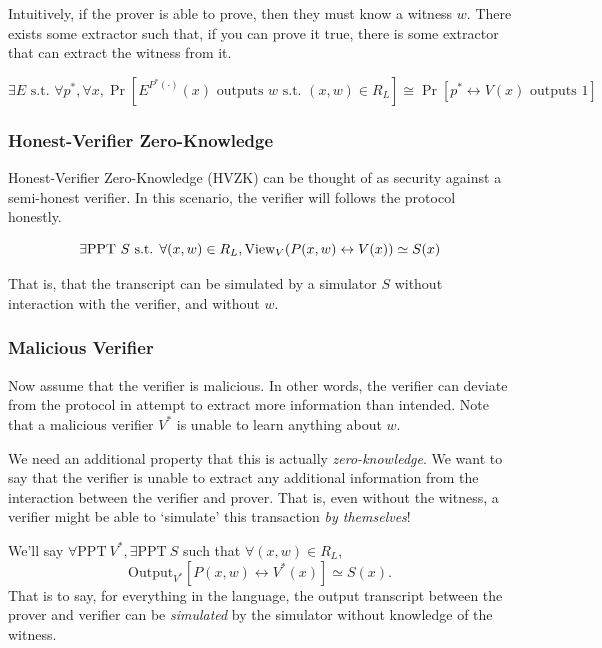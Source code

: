 Intuitively, if the prover is able to prove, then they must know a witness $w$. There exists some extractor such that, if you can prove it true, there is some extractor that can extract the witness from it.

\[ \exists E \text{ s.t. } \forall p^*, \forall x, \Pr[E^{P^*(\cdot)}(x) \text{ outputs }w \text{ s.t. }(x, w) \in R_L] \cong \Pr[p^* \leftrightarrow V(x) \text{ outputs } 1]\]

\subsubsection{Honest-Verifier Zero-Knowledge}

Honest-Verifier Zero-Knowledge (HVZK) can be thought of as security against a semi-honest verifier. In this scenario, the verifier will follows the protocol honestly.

\[\exists\mathrm{PPT}\ S\text{ s.t. }\forall(x, w)\in R_L, \mathrm{View}_V(P(x, w)\leftrightarrow V(x))\simeq S(x)\]

That is, that the transcript can be simulated by a simulator $S$ without interaction with the verifier, and without $w$.

\subsubsection{Malicious Verifier}

Now assume that the verifier is malicious. In other words, the verifier can deviate from the protocol in attempt to extract more information than intended. Note that a malicious verifier $V^*$ is unable to learn anything about $w$.

We need an additional property that this is actually \emph{zero-knowledge}. We want to say that the verifier is unable to extract any additional information from the interaction between the verifier and prover. That is, even without the witness, a verifier might be able to `simulate' this transaction \emph{by themselves}!

    We'll say $\forall \mathrm{PPT}\ V^*, \exists \mathrm{PPT}\ S$ such that $\forall (x, w)\in R_L$,
    \[\mathrm{Output}_{V^*}[P(x, w)\leftrightarrow V^*(x)]\simeq S(x).\]
    That is to say, for everything in the language, the output transcript between the prover and verifier can be \emph{simulated} by the simulator without knowledge of the witness.


